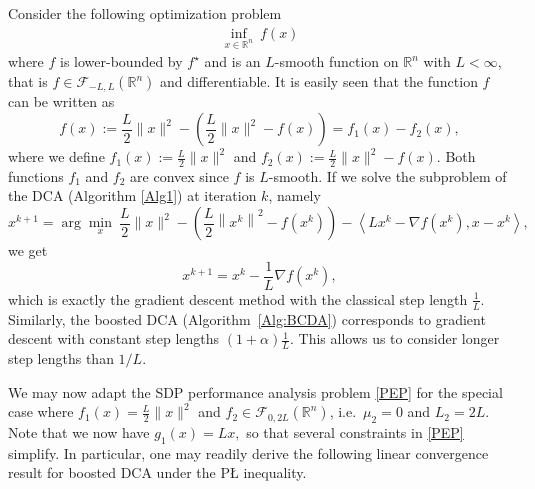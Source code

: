 \documentclass{article} %
\begin{document}
Consider the following optimization problem
\begin{align*}
    \inf_{x\in\mathbb{R}^n} \ f(x)
\end{align*}
where $f$ is lower-bounded by $f^\star$ and is an $L$-smooth function on $\mathbb{R}^n$ with $L<\infty$, that is $f\in\mathcal{F}_{-L,L}(\mathbb{R}^n)$ and differentiable. It is easily seen that the function $f$ can be written as
\[
f(x):=\frac{L}{2}\|x\|^2-\left(\frac{L}{2}\|x\|^2-f(x)\right) =  f_1(x) - f_2(x),
\]
where we define $f_1(x):=\frac{L}{2}\|x\|^2$ and $f_2(x):=\frac{L}{2}\|x\|^2-f(x)$.
Both functions $f_1$ and $f_2$ are convex since $f$ is $L$-smooth. If we solve the subproblem of the DCA (Algorithm \ref{Alg1})
at iteration $k$, namely
\[
x^{k+1}=\arg\min_x\ \frac{L}{2}\|x\|^2-\left(\frac{L}{2}\left\|x^k\right\|^2-f(x^k)\right)-\left\langle {L}x^k-\nabla f(x^k), x-x^k\right\rangle,
\]
we get
\[
x^{k+1}=x^k-\frac{1}{L}\nabla f(x^k),
\]
which is exactly the gradient descent method with the classical step length $\frac{1}{L}$.
Similarly, the boosted DCA (Algorithm~\ref{Alg:BCDA}) corresponds to gradient descent with constant step lengths
$(1+\alpha)\frac{1}{L}$. This allows us to consider longer step lengths than $1/L$.

We may now adapt the SDP performance analysis problem \eqref{PEP} for the special case where $f_1(x) = \frac{L}{2}\|x\|^2$
  and $f_2 \in\mathcal{F}_{0, 2L}({\mathbb{R}^n})$, i.e.\ $\mu_2 = 0$ and $L_2 = 2L$.
  Note that we now have
  $
  g_1(x) = Lx,
  $
  so that several constraints in \eqref{PEP} simplify.
In particular, one may readily derive the following linear convergence result for boosted DCA under the P{\L} inequality.
\end{document}
